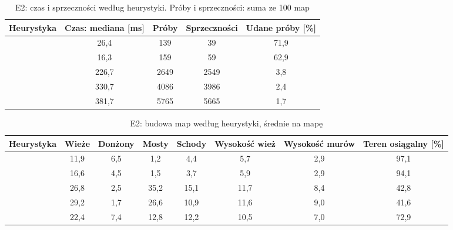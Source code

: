 
\begin{table}
  \centering
  \footnotesize
  \caption[E2: czas i sprzeczności według heurystyki]{E2: czas i sprzeczności według heurystyki. Próby i sprzeczności: suma ze 100 map}
  \label{tab:e2}
  \begin{tabularx}{\linewidth}{@{}lCCCC@{}}
    \toprule
    Heurystyka & Czas: mediana [ms] & Próby & Sprzeczności & Udane próby [\%] \\
    \midrule
     & 26,4 & 139 & 39 & 71,9 \\
     & 16,3 & 159 & 59 & 62,9 \\
     & 226,7 & 2649 & 2549 & 3,8 \\
     & 330,7 & 4086 & 3986 & 2,4 \\
     & 381,7 & 5765 & 5665 & 1,7 \\
    \bottomrule
  \end{tabularx}
\end{table}


\begin{table}
  \centering
  \footnotesize
  \caption[E2: budowa map według heurystyki]{E2: budowa map według heurystyki, średnie na mapę}
  \label{tab:e2-budowa}
  \begin{tabularx}{\linewidth}{@{}lCCCCCCC@{}}
    \toprule
    Heurystyka & Wieże & Donżony & Mosty & Schody & Wysokość wież & Wysokość murów & Teren osiągalny [\%] \\
    \midrule
     & 11,9 & 6,5 & 1,2 & 4,4 & 5,7 & 2,9 & 97,1 \\
     & 16,6 & 4,5 & 1,5 & 3,7 & 5,9 & 2,9 & 94,1 \\
     & 26,8 & 2,5 & 35,2 & 15,1 & 11,7 & 8,4 & 42,8 \\
     & 29,2 & 1,7 & 26,6 & 10,9 & 11,6 & 9,0 & 41,6 \\
     & 22,4 & 7,4 & 12,8 & 12,2 & 10,5 & 7,0 & 72,9 \\
    \bottomrule
  \end{tabularx}
\end{table}

